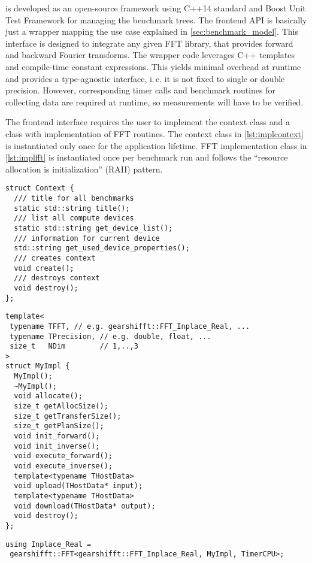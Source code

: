 

\gearshifft{} is developed as an open-source framework using C++14 standard and Boost Unit Test Framework for managing the benchmark trees.
The frontend API is basically just a wrapper mapping the use case explained in \cref{sec:benchmark_model}.
This interface is designed to integrate any given FFT library, that provides forward and backward Fourier transforms.
The wrapper code leverages C++ templates and compile-time constant expressions.
This yields minimal overhead at runtime and provides a type-agnostic interface, i.\,e. it is not fixed to single or double precision.
However, corresponding timer calls and benchmark routines for collecting data are required at runtime, so measurements will have to be verified.

The frontend interface requires the user to implement the context class and a class with implementation of FFT routines.
The context class in \cref{lst:implcontext} is instantiated only once for the application lifetime.
FFT implementation class in \cref{lst:implfft} is instantiated once per benchmark run and follows the ``resource allocation is initialization'' (RAII) pattern.


\begin{lstlisting}[caption={Context class required by gearshifft API},label={lst:implcontext}]
struct Context {
  /// title for all benchmarks
  static std::string title();
  /// list all compute devices
  static std::string get_device_list();
  /// information for current device
  std::string get_used_device_properties();
  /// creates context
  void create();
  /// destroys context
  void destroy();
};
\end{lstlisting}
\begin{lstlisting}[caption={FFT class required by gearshifft API},label={lst:implfft}]
template<
 typename TFFT, // e.g. gearshifft::FFT_Inplace_Real, ...
 typename TPrecision, // e.g. double, float, ...
 size_t   NDim        // 1,..,3
>
struct MyImpl {
  MyImpl();
  ~MyImpl();
  void allocate();
  size_t getAllocSize();
  size_t getTransferSize();
  size_t getPlanSize();
  void init_forward();
  void init_inverse();
  void execute_forward();
  void execute_inverse();
  template<typename THostData>
  void upload(THostData* input);
  template<typename THostData>
  void download(THostData* output);
  void destroy();
};
\end{lstlisting}
\begin{lstlisting}[caption={Using FFT class},label={lst:implfftusing}]
using Inplace_Real =
 gearshifft::FFT<gearshifft::FFT_Inplace_Real, MyImpl, TimerCPU>;
\end{lstlisting}

